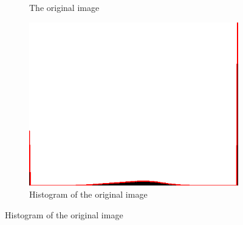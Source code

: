\begin{figure}[H]
\begin{subfigure}[b]{0.16\textwidth}
        \caption{The original image}
        \label{fig:img2_src}
    \end{subfigure}
    \begin{subfigure}[b]{0.16\textwidth}
        \includegraphics[width=\textwidth]{img2/hist.png}
        \caption{Histogram of the original image}
        \label{fig:img2_hist}
    \end{subfigure}
    

\end{figure}
